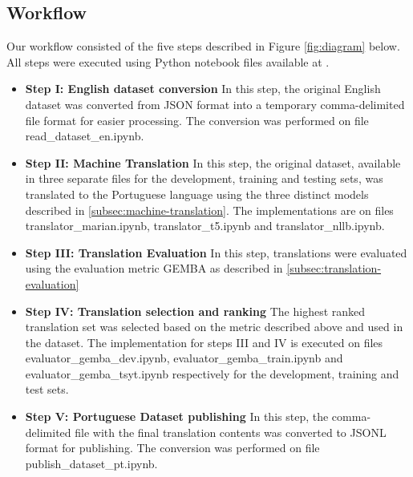 \documentclass{article}
\begin{document}
\subsection{Workflow}
Our workflow consisted of the five steps described in Figure
\ref{fig:diagram} below. All steps were executed using Python notebook files
available at \cite{socialiqa_pt_impl}.

\begin{itemize}
    \item \textbf{Step I: English dataset conversion} In this step, the original
    English dataset was converted from JSON format into a temporary 
    comma-delimited file format for easier processing. The conversion was
    performed on file read\_dataset\_en.ipynb.
    \item \textbf{Step II: Machine Translation} In this step, the original
    dataset, available in three separate files for the development, training and
    testing sets, was translated to the Portuguese language using the three
    distinct models described in \ref{subsec:machine-translation}. The
    implementations are on files translator\_marian.ipynb, translator\_t5.ipynb
    and translator\_nllb.ipynb.
    \item \textbf{Step III: Translation Evaluation} In this step, translations were evaluated
    using the evaluation metric GEMBA as described in \ref{subsec:translation-evaluation}
    \item \textbf{Step IV: Translation selection and ranking} The highest ranked translation set
    was selected based on the metric described above and used in the dataset.
    The implementation for steps III and IV is executed on files
    evaluator\_gemba\_dev.ipynb, evaluator\_gemba\_train.ipynb and
    evaluator\_gemba\_tsyt.ipynb respectively for the development, training and
    test sets.
    \item \textbf{Step V: Portuguese Dataset publishing}  In this step, the
    comma-delimited file with the final translation contents was converted to
    JSONL format for publishing. The conversion was performed on file 
    publish\_dataset\_pt.ipynb.
\end{itemize}
\end{document}
